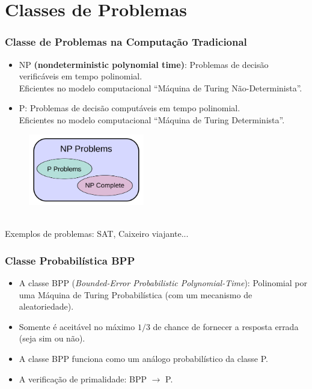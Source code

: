 \documentclass{beamer}
\begin{document}
\section{Classes de Problemas}
\begin{frame}
  \frametitle{Classe de Problemas na Computação Tradicional}
  \begin{itemize}
  \item NP \textbf{(nondeterministic polynomial time)}:
    Problemas de decisão verificáveis em tempo polinomial.\\ \small{Eficientes no
    modelo computacional ``Máquina de Turing Não-Determinista''}.
    \item P: Problemas de decisão computáveis em tempo polinomial.\\ \small{Eficientes no
    modelo computacional ``Máquina de Turing Determinista''}.
  \end{itemize}
  \begin{figure}[h]
    \label{classpnp}
    \centering
    \includegraphics[width=0.45\textwidth]{classpnp.png}
  \end{figure}
  \\
  Exemplos de problemas: SAT, Caixeiro viajante...
\end{frame}

\begin{frame}
\frametitle{Classe Probabilística BPP} 
\begin{itemize}
  \item A classe BPP (\textit{Bounded-Error Probabilistic
      Polynomial-Time}): Polinomial por uma Máquina de Turing Probabilística (com um
    mecanismo de aleatoriedade).
  \item Somente é aceitável no máximo $1/3$ de chance de fornecer a
  resposta errada (seja sim ou não).
  \item A classe BPP funciona como um análogo probabilístico da classe P.
  \item A verificação de primalidade: BPP $\rightarrow$ P.
\end{itemize}
\end{frame}
\end{document}
